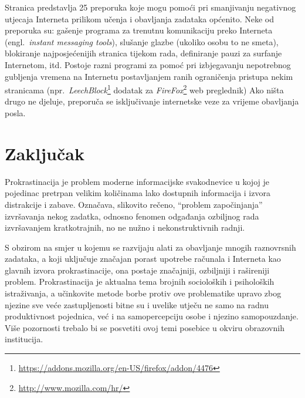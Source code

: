 \documentclass[11pt,twocolumn,english]{article}
\newcommand{\engl}[1]{(engl.~\emph{#1})}
\begin{document}
Stranica \cite{ColDeg25ways} predstavlja 25 preporuka koje mogu pomoći pri
smanjivanju negativnog utjecaja Interneta prilikom učenja i obavljanja zadataka
općenito. Neke od preporuka su: gašenje programa za trenutnu komunikaciju preko
Interneta \engl{instant messaging tools}, slušanje glazbe (ukoliko osobu to ne
smeta), blokiranje najposjećenijih stranica tijekom rada, definiranje pauzi za
surfanje Internetom, itd. Postoje razni programi za pomoć pri izbjegavanju
nepotrebnog gubljenja vremena na Internetu postavljanjem ranih ograničenja
pristupa nekim stranicama
(npr.~\emph{LeechBlock}\footnote{\url{https://addons.mozilla.org/en-US/firefox/addon/4476}}
dodatak za \emph{FireFox}\footnote{\url{http://www.mozilla.com/hr/}} web
preglednik) Ako ništa drugo ne djeluje, preporuča se isključivanje internetske
veze za vrijeme obavljanja posla.


\section{Zaključak}

Prokrastinacija je problem moderne informacijske svakodnevice u kojoj 
je pojedinac pretrpan velikim količinama lako dostupnih  informacija i 
izvora distrakcije i zabave. Označava, slikovito rečeno, ``problem započinjanja'' 
izvršavanja nekog zadatka, odnosno fenomen odgađanja ozbiljnog rada 
izvršavanjem kratkotrajnih, no ne nužno i nekonstruktivnih radnji. 

S obzirom na smjer u kojemu se razvijaju alati za obavljanje mnogih raznovrsnih 
zadataka, a koji uključuje značajan porast upotrebe računala i Interneta kao glavnih 
izvora prokrastinacije, ona postaje značajniji, ozbiljniji i rašireniji
problem. Prokrastinacija je aktualna tema brojnih socioloških i psiholoških 
istraživanja, a učinkovite metode borbe protiv ove problematike upravo zbog 
njezine sve veće zastupljenosti bitne su i uvelike utječu ne samo na radnu produktivnost 
pojednica, već i na samopercepciju osobe i njezino samopouzdanje. Više pozornosti 
trebalo bi se posvetiti ovoj temi posebice u okviru obrazovnih institucija.



\end{document}
